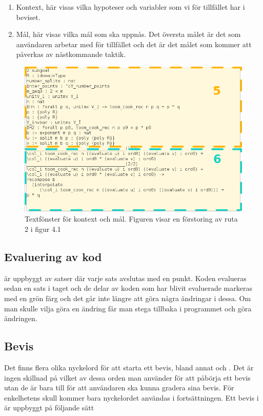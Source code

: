 \begin{enumerate}[5.]
\item Kontext, här visas vilka hypoteser och variabler som vi för tillfället
  har i beviset.
\item Mål, här visas vilka mål som ska uppnås. Det översta målet är det som
  användaren arbetar med för tillfället och det är det målet som kommer att
  påverkas av nästkommande taktik.
\end{enumerate}

\begin{figure}[H]
  \centering
  \includegraphics[width=150mm]{images/Kontext}
  \caption[Fönster för kontext och mål]
   {Textfönster för kontext och mål. Figuren visar en förstoring av ruta 2 i
    figur 4.1}
\end{figure}


\subsection{Evaluering av kod}
\coq{} är uppbyggt av satser där varje sats avslutas med en punkt. Koden
evalueras sedan en sats i taget och de delar av koden som har blivit evaluerade
markeras med en grön färg och det går inte längre att göra några ändringar i
dessa. Om man skulle vilja göra en ändring får man stega tillbaka
i programmet och göra ändringen.

\subsection{Bevis}
Det finns flera olika nyckelord för att starta ett bevis, bland annat
 och . Det är ingen skillnad på vilket av dessa orden man
använder för att påbörja ett bevis utan de är bara till för att användaren ska
kunna gradera sina bevis. För enkelhetens skull kommer bara nyckelordet
 användas i fortsättningen. Ett bevis i \coq{} är uppbyggt på följande
sätt

